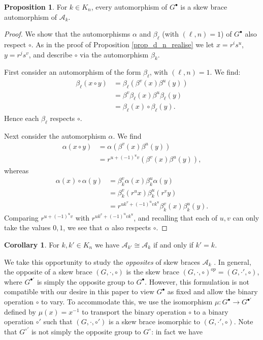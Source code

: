 \documentclass[reqno]{amsart}
\theoremstyle{definition}
\newtheorem{proposition}[theorem]{Proposition}
\newtheorem{corollary}[theorem]{Corollary}
\begin{document}
\begin{proposition} \label{prop_d_n_isomorphism}
For $ k \in K_{n} $, every automorphism of $ G^{\bullet} $ is a skew brace automorphism of $ \mathscr{A}_{k} $. 
\end{proposition}
\begin{proof}
We show that the automorphisms $ \alpha $ and $ \beta_{\ell} $ (with $ (\ell,n)=1 $) of $ G^{\bullet} $ also respect $ \circ $. As in the proof of Proposition \ref{prop_d_n_realise} we let $ x=r^{i}s^{u} $, $ y=r^{j}s^{v} $, and describe $ \circ $ via the automorphism $ \beta_{k} $. 

First consider an automorphism of the form $ \beta_{\ell} $, with $ (\ell,n)=1 $. We find:
\begin{align*}
\beta_{\ell}( x \circ y ) &= \beta_{\ell} (\beta^{v}(x)\beta^{u}(y)) \\
&= \beta^{v}\beta_{\ell}(x)\beta^{u}\beta_{\ell}(y) \\
&= \beta_{\ell}(x) \circ \beta_{\ell}(y). 
\end{align*}
Hence each $ \beta_{\ell} $ respects $ \circ $. 

Next consider the automorphism $ \alpha $. We find
\begin{align*}
\alpha( x \circ y ) &= \alpha (\beta^{v}(x)\beta^{u}(y)) \\
&= r^{u+(-1)^{u}v} (\beta^{v}(x)\beta^{u}(y)),
\end{align*}
whereas 
\begin{align*}
\alpha( x ) \circ \alpha( y ) &= \beta_{k}^{v}\alpha(x)\beta_{k}^{u}\alpha(y) \\
&= \beta_{k}^{v}( r^{u}x )\beta_{k}^{u}( r^{v} y ) \\
&= r^{uk^{v} + (-1)^{u}vk^{u}} \beta_{k}^{v}( x )\beta_{k}^{u}( y ). 
\end{align*}
Comparing $ r^{u+(-1)^{u}v}  $ with $ r^{uk^{v} + (-1)^{u}vk^{u}} $, and recalling that each of $ u,v $ can only take the values $ 0,1 $, we see that $ \alpha $ also respects $ \circ $. 
\end{proof}

\begin{corollary}
For $ k,k' \in K_{n} $ we have $ \mathscr{A}_{k'} \cong \mathscr{A}_{k} $ if and only if $ k'=k $. 
\end{corollary}

We take this opportunity to study the \textit{opposites} of skew braces $ \mathscr{A}_{k} $ \cite{KT20}. In general, the opposite of a skew brace $ (G,\cdot,\circ) $ is the skew brace $ (G,\cdot,\circ)^{op} = (G,\cdot',\circ) $, where $ G^{\bullet'} $ is simply the opposite group to $ G^{\bullet} $. However, this formulation is not compatible with our desire in this paper to view $ G^{\bullet} $ as fixed and allow the binary operation $ \circ $ to vary. To accommodate this, we use the isomorphism $ \mu : G^{\bullet} \rightarrow G^{\bullet'} $ defined by $ \mu(x) = x^{-1} $ to transport the binary operation $ \circ $ to a binary operation $ \circ' $ such that $ (G,\cdot,\circ') $ is a skew brace isomorphic to $ (G,\cdot',\circ) $. Note that $ G^{\circ'} $ is not simply the opposite group to $ G^{\circ} $: in fact we have
\end{document}
